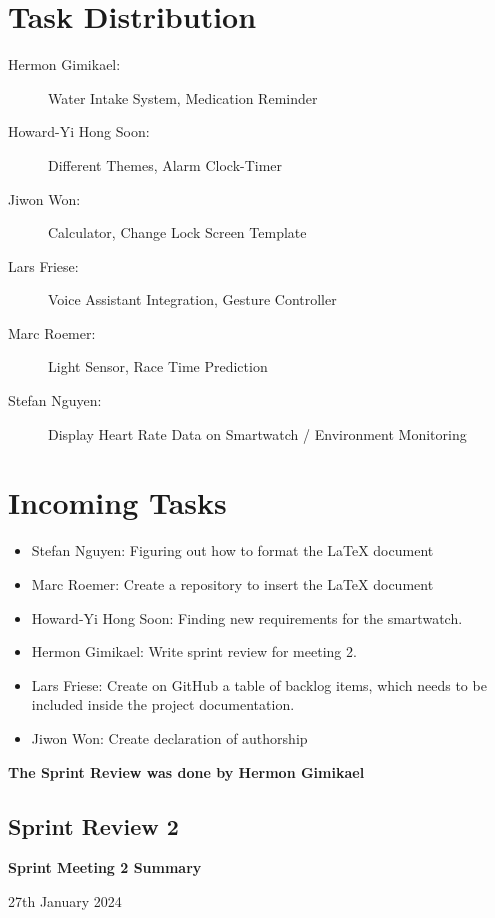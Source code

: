 \documentclass{article}
\begin{document}
\section*{Task Distribution}
\begin{description}
    \item[Hermon Gimikael:] Water Intake System, Medication Reminder 
    \item[Howard-Yi Hong Soon:] Different Themes, Alarm Clock-Timer
    \item[Jiwon Won:] Calculator, Change Lock Screen Template
    \item[Lars Friese:] Voice Assistant Integration, Gesture Controller
    \item[Marc Roemer:] Light Sensor, Race Time Prediction
    \item[Stefan Nguyen:] Display Heart Rate Data on Smartwatch / Environment Monitoring
\end{description}

\section*{Incoming Tasks}
\begin{itemize}
    \item Stefan Nguyen: Figuring out how to format the LaTeX document
    \item Marc Roemer: Create a repository to insert the LaTeX document
    \item Howard-Yi Hong Soon: Finding new requirements for the smartwatch.
    \item Hermon Gimikael: Write sprint review for meeting 2.
    \item Lars Friese: Create on GitHub a table of backlog items, which needs to be included inside the project documentation.
    \item Jiwon Won: Create declaration of authorship
\end{itemize}
\noindent
\textbf{The Sprint Review was done by Hermon Gimikael}
\newpage

\subsection{Sprint Review 2}
\begin{center}
    {\Large \textbf{Sprint Meeting 2 Summary}}
    
    \vspace{0.5cm}
    
    {\large 27th January 2024}
\end{center}
\end{document}

